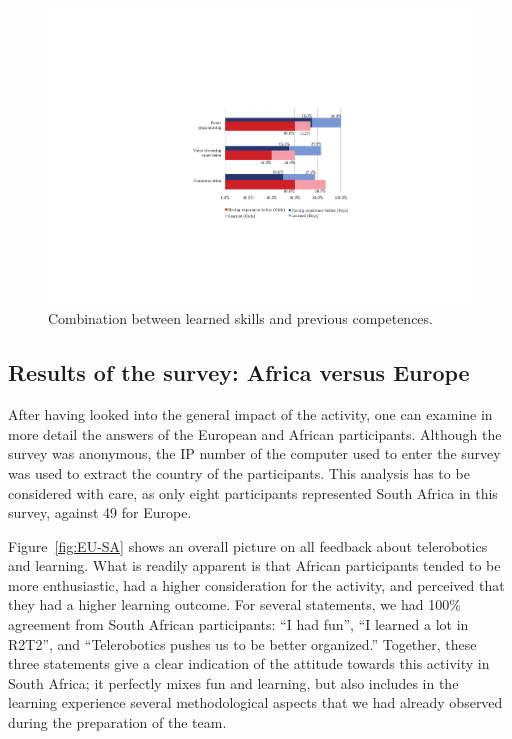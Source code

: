 \documentclass{intech-journal}
\begin{document}
\begin{figure}[ht]
 \centering
    \includegraphics[width=0.6\columnwidth]{figures/learned.pdf}
  \caption{Combination between learned skills and previous competences.}
  \label{fig:learned} 
\end{figure}

\subsection{Results of the survey: Africa versus Europe}

After having looked into the general impact of the activity, one can examine in more detail the answers of the European and African participants. 
Although the survey was anonymous, the IP number of the computer used to enter the survey was used to extract the country of the participants.
This analysis has to be considered with care, as only eight participants represented South Africa in this survey, against 49 for Europe.


Figure~\ref{fig:EU-SA} shows an overall picture on all feedback about telerobotics and learning.
What is readily apparent is that African participants tended to be more enthusiastic, had a higher consideration for the activity, and perceived that they had a higher learning outcome. 
For several statements, we had 100\% agreement from South African participants: ``I had fun'', ``I learned a lot in R2T2'', and ``Telerobotics pushes us to be better organized.''
Together, these three statements give a clear indication of the attitude towards this activity in South Africa; it perfectly mixes fun and learning, but also includes in the learning experience several methodological aspects that we had already observed during the preparation of the team. 
\end{document}
